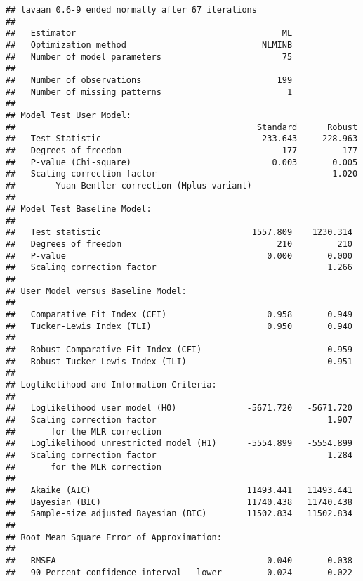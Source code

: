 \documentclass[
  english,
  man]{apa6}
\begin{document}
\begin{verbatim}
## lavaan 0.6-9 ended normally after 67 iterations
## 
##   Estimator                                         ML
##   Optimization method                           NLMINB
##   Number of model parameters                        75
##                                                       
##   Number of observations                           199
##   Number of missing patterns                         1
##                                                       
## Model Test User Model:
##                                                Standard      Robust
##   Test Statistic                                233.643     228.963
##   Degrees of freedom                                177         177
##   P-value (Chi-square)                            0.003       0.005
##   Scaling correction factor                                   1.020
##        Yuan-Bentler correction (Mplus variant)                     
## 
## Model Test Baseline Model:
## 
##   Test statistic                              1557.809    1230.314
##   Degrees of freedom                               210         210
##   P-value                                        0.000       0.000
##   Scaling correction factor                                  1.266
## 
## User Model versus Baseline Model:
## 
##   Comparative Fit Index (CFI)                    0.958       0.949
##   Tucker-Lewis Index (TLI)                       0.950       0.940
##                                                                   
##   Robust Comparative Fit Index (CFI)                         0.959
##   Robust Tucker-Lewis Index (TLI)                            0.951
## 
## Loglikelihood and Information Criteria:
## 
##   Loglikelihood user model (H0)              -5671.720   -5671.720
##   Scaling correction factor                                  1.907
##       for the MLR correction                                      
##   Loglikelihood unrestricted model (H1)      -5554.899   -5554.899
##   Scaling correction factor                                  1.284
##       for the MLR correction                                      
##                                                                   
##   Akaike (AIC)                               11493.441   11493.441
##   Bayesian (BIC)                             11740.438   11740.438
##   Sample-size adjusted Bayesian (BIC)        11502.834   11502.834
## 
## Root Mean Square Error of Approximation:
## 
##   RMSEA                                          0.040       0.038
##   90 Percent confidence interval - lower         0.024       0.022

\end{verbatim}
\end{document}
